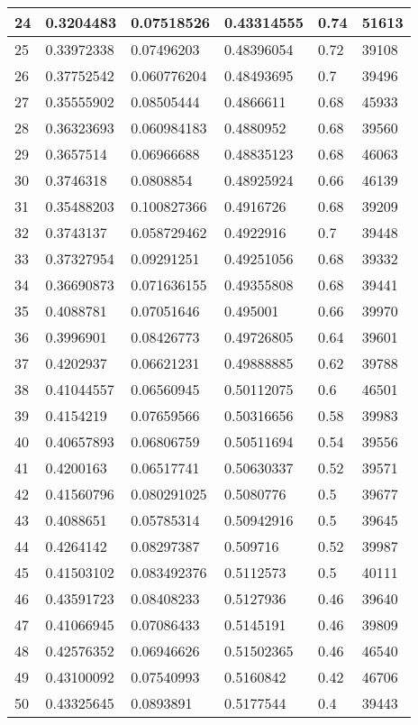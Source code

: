 \begin{longtable}{|l|l|l|l|l|l|}
24 & 0.3204483 & 0.07518526 & 0.43314555 & 0.74 & 51613 \\ \hline 
25 & 0.33972338 & 0.07496203 & 0.48396054 & 0.72 & 39108 \\ \hline 
26 & 0.37752542 & 0.060776204 & 0.48493695 & 0.7 & 39496 \\ \hline 
27 & 0.35555902 & 0.08505444 & 0.4866611 & 0.68 & 45933 \\ \hline 
28 & 0.36323693 & 0.060984183 & 0.4880952 & 0.68 & 39560 \\ \hline 
29 & 0.3657514 & 0.06966688 & 0.48835123 & 0.68 & 46063 \\ \hline 
30 & 0.3746318 & 0.0808854 & 0.48925924 & 0.66 & 46139 \\ \hline 
31 & 0.35488203 & 0.100827366 & 0.4916726 & 0.68 & 39209 \\ \hline 
32 & 0.3743137 & 0.058729462 & 0.4922916 & 0.7 & 39448 \\ \hline 
33 & 0.37327954 & 0.09291251 & 0.49251056 & 0.68 & 39332 \\ \hline 
34 & 0.36690873 & 0.071636155 & 0.49355808 & 0.68 & 39441 \\ \hline 
35 & 0.4088781 & 0.07051646 & 0.495001 & 0.66 & 39970 \\ \hline 
36 & 0.3996901 & 0.08426773 & 0.49726805 & 0.64 & 39601 \\ \hline 
37 & 0.4202937 & 0.06621231 & 0.49888885 & 0.62 & 39788 \\ \hline 
38 & 0.41044557 & 0.06560945 & 0.50112075 & 0.6 & 46501 \\ \hline 
39 & 0.4154219 & 0.07659566 & 0.50316656 & 0.58 & 39983 \\ \hline 
40 & 0.40657893 & 0.06806759 & 0.50511694 & 0.54 & 39556 \\ \hline 
41 & 0.4200163 & 0.06517741 & 0.50630337 & 0.52 & 39571 \\ \hline 
42 & 0.41560796 & 0.080291025 & 0.5080776 & 0.5 & 39677 \\ \hline 
43 & 0.4088651 & 0.05785314 & 0.50942916 & 0.5 & 39645 \\ \hline 
44 & 0.4264142 & 0.08297387 & 0.509716 & 0.52 & 39987 \\ \hline 
45 & 0.41503102 & 0.083492376 & 0.5112573 & 0.5 & 40111 \\ \hline 
46 & 0.43591723 & 0.08408233 & 0.5127936 & 0.46 & 39640 \\ \hline 
47 & 0.41066945 & 0.07086433 & 0.5145191 & 0.46 & 39809 \\ \hline 
48 & 0.42576352 & 0.06946626 & 0.51502365 & 0.46 & 46540 \\ \hline 
49 & 0.43100092 & 0.07540993 & 0.5160842 & 0.42 & 46706 \\ \hline 
50 & 0.43325645 & 0.0893891 & 0.5177544 & 0.4 & 39443 \\ \hline 
\end{longtable}